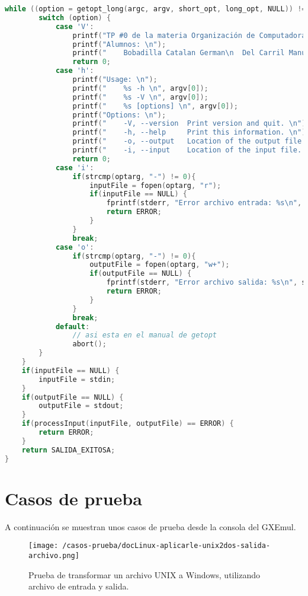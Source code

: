 \documentclass[a4paper]{article}
\begin{document}
\begin{lstlisting}[language=C]
    while ((option = getopt_long(argc, argv, short_opt, long_opt, NULL)) != -1) {
        switch (option) {
            case 'V':
                printf("TP #0 de la materia Organización de Computadoras \n");
                printf("Alumnos: \n");
                printf("	Bobadilla Catalan German\n	Del Carril Manuel \n	Quino Lopez Julian \n");
                return 0;
            case 'h':
                printf("Usage: \n");
                printf("	%s -h \n", argv[0]);
                printf("	%s -V \n", argv[0]);
                printf("	%s [options] \n", argv[0]);
                printf("Options: \n");
                printf("	-V, --version  Print version and quit. \n");
                printf("	-h, --help     Print this information. \n");
                printf("	-o, --output   Location of the output file. \n");
                printf("	-i, --input    Location of the input file. \n");
                return 0;
            case 'i':
            	if(strcmp(optarg, "-") != 0){
            		inputFile = fopen(optarg, "r");
            		if(inputFile == NULL) {
            			fprintf(stderr, "Error archivo entrada: %s\n", strerror(errno));
            			return ERROR;
            		}
            	}
                break;
            case 'o':
            	if(strcmp(optarg, "-") != 0){
            		outputFile = fopen(optarg, "w+");
            		if(outputFile == NULL) {
            			fprintf(stderr, "Error archivo salida: %s\n", strerror(errno));
            			return ERROR;
            		}
            	}
                break;
            default:
                // asi esta en el manual de getopt
                abort();
        }
    }
    if(inputFile == NULL) {
        inputFile = stdin;
    }
    if(outputFile == NULL) {
        outputFile = stdout;
    }
    if(processInput(inputFile, outputFile) == ERROR) {
    	return ERROR;
    }
    return SALIDA_EXITOSA;
}

\end{lstlisting}

\section{Casos de prueba}

A continuación se muestran unos casos de prueba desde la consola del GXEmul.


\begin{figure}[!htp]
\begin{center}
\texttt{[image: /casos-prueba/docLinux-aplicarle-unix2dos-salida-archivo.png]}
\caption{Prueba de transformar un archivo UNIX a Windows, utilizando archivo de entrada y salida.} \label{fig001}
\end{center}
\end{figure}
\end{document}
